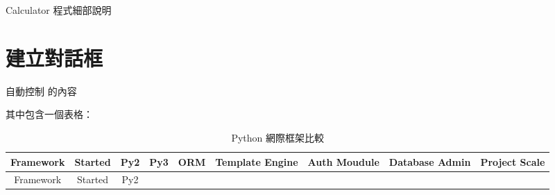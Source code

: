 \documentclass[12pt,,]{report}
\begin{document}
Calculator 程式細部說明

\hypertarget{ux5efaux7acbux5c0dux8a71ux6846}{%
\section{建立對話框}\label{ux5efaux7acbux5c0dux8a71ux6846}}

自動控制 的內容

其中包含一個表格：

\begin{longtable}[]{@{}ccccccccc@{}}
\caption{Python 網際框架比較 \label{tbl:網際框架}}\tabularnewline
\toprule
\begin{minipage}[b]{0.09\columnwidth}\centering
Framework\strut
\end{minipage} & \begin{minipage}[b]{0.07\columnwidth}\centering
Started\strut
\end{minipage} & \begin{minipage}[b]{0.04\columnwidth}\centering
Py2\strut
\end{minipage} & \begin{minipage}[b]{0.04\columnwidth}\centering
Py3\strut
\end{minipage} & \begin{minipage}[b]{0.04\columnwidth}\centering
ORM\strut
\end{minipage} & \begin{minipage}[b]{0.13\columnwidth}\centering
Template Engine\strut
\end{minipage} & \begin{minipage}[b]{0.11\columnwidth}\centering
Auth Moudule\strut
\end{minipage} & \begin{minipage}[b]{0.12\columnwidth}\centering
Database Admin\strut
\end{minipage} & \begin{minipage}[b]{0.11\columnwidth}\centering
Project Scale\strut
\end{minipage}\tabularnewline
\midrule
\endfirsthead
\toprule
\begin{minipage}[b]{0.09\columnwidth}\centering
Framework\strut
\end{minipage} & \begin{minipage}[b]{0.07\columnwidth}\centering
Started\strut
\end{minipage} & \begin{minipage}[b]{0.04\columnwidth}\centering
Py2\strut
\end{minipage} & \begin{minipage}[b]{0.04\columnwidth}\centering

\end{minipage}
\end{longtable}
\end{document}
